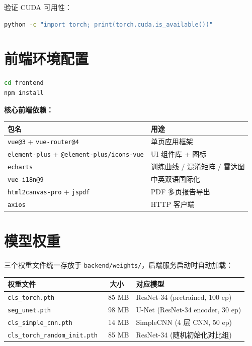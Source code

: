 \documentclass[12pt, a4paper, openany]{ctexbook}
\begin{document}
验证 CUDA 可用性：

\begin{lstlisting}[language=bash]
python -c "import torch; print(torch.cuda.is_available())"
\end{lstlisting}

\section{前端环境配置}

\begin{lstlisting}[language=bash]
cd frontend
npm install
\end{lstlisting}

\textbf{核心前端依赖：}

\begin{center}
\begin{tabular}{lL{8cm}}
  \toprule
  \textbf{包名} & \textbf{用途} \\
  \midrule
  \texttt{vue@3} + \texttt{vue-router@4} & 单页应用框架 \\
  \texttt{element-plus} + \texttt{@element-plus/icons-vue} & UI 组件库 + 图标 \\
  \texttt{echarts} & 训练曲线 / 混淆矩阵 / 雷达图 \\
  \texttt{vue-i18n@9} & 中英双语国际化 \\
  \texttt{html2canvas-pro} + \texttt{jspdf} & PDF 多页报告导出 \\
  \texttt{axios} & HTTP 客户端 \\
  \bottomrule
\end{tabular}
\end{center}

\section{模型权重}

三个权重文件统一存放于 \texttt{backend/weights/}，后端服务启动时自动加载：

\begin{center}
\begin{tabular}{L{5.2cm}cL{5cm}}
  \toprule
  \textbf{权重文件} & \textbf{大小} & \textbf{对应模型} \\
  \midrule
  \texttt{cls\_torch.pth}              & ~85 MB & ResNet-34 (pretrained, 100 ep) \\
  \texttt{seg\_unet.pth}               & ~98 MB & U-Net (ResNet-34 encoder, 30 ep) \\
  \texttt{cls\_simple\_cnn.pth}        & ~14 MB & SimpleCNN (4 层 CNN, 50 ep) \\
  \texttt{cls\_torch\_random\_init.pth}  & ~85 MB & ResNet-34 (随机初始化对比组) \\
  \bottomrule
\end{tabular}
\end{center}
\end{document}
